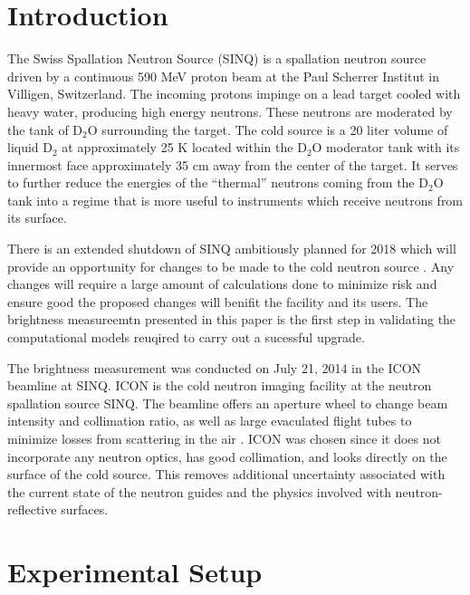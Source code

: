 \documentclass[5p,12pt]{elsarticle}
\begin{document}


\section{Introduction}
\label{sec:intro}

The Swiss Spallation Neutron Source (SINQ) is a spallation neutron source driven by a continuous 590 MeV proton beam at the Paul Scherrer Institut in Villigen, Switzerland.  The incoming protons impinge on a lead target cooled with heavy water, producing high energy neutrons.  These neutrons are moderated by the tank of D$_2$O surrounding the target.  The cold source is a 20 liter volume of liquid D$_2$ at approximately 25 K located within the D$_2$O moderator tank with its innermost face approximately 35 cm away from the center of the target.  It serves to further reduce the energies of the ``thermal'' neutrons coming from the D$_2$O tank into a regime that is more useful to instruments which receive neutrons from its surface.  

There is an extended shutdown of SINQ ambitiously planned for 2018 which will provide an opportunity for changes to be made to the cold neutron source \cite{rueegg_icans}.  Any changes will require a large amount of calculations done to minimize risk and ensure good the proposed changes will benifit the facility and its users.  The brightness measureemtn presented in this paper is the first step in validating the computational models reuqired to carry out a sucessful upgrade.  

The brightness measurement was conducted on July 21, 2014 in the ICON beamline at SINQ.  ICON is the cold neutron imaging facility at the neutron spallation source SINQ. The beamline offers an aperture wheel to change beam intensity and collimation ratio, as well as large evaculated flight tubes to minimize losses from scattering in the air \cite{icon}.  ICON was chosen since it does not incorporate any neutron optics, has good collimation, and looks directly on the surface of the cold source.  This removes additional uncertainty associated with the current state of the neutron guides and the physics involved with neutron-reflective surfaces.


%
%
%
%
%


\section{Experimental Setup}
\label{sec:setup}
\end{document}
